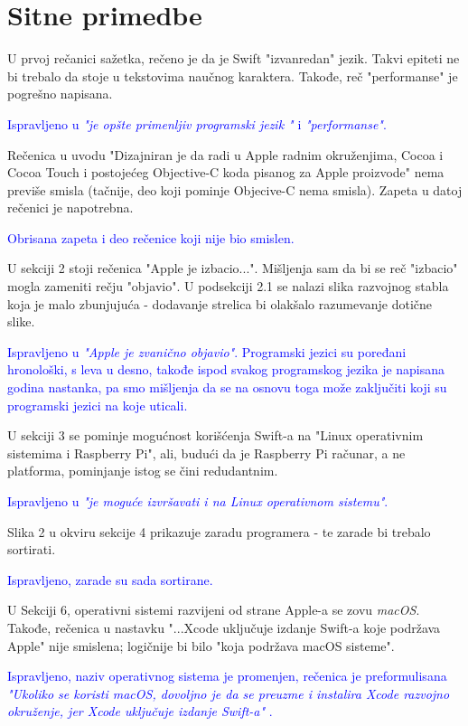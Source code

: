 \documentclass[a4paper]{report}
\newcommand{\odgovor}[1]{\textcolor{blue}{#1}}
\begin{document}
\section{Sitne primedbe}

U prvoj rečanici sažetka, rečeno je da je Swift "izvanredan" jezik. Takvi epiteti ne bi trebalo da stoje u tekstovima naučnog karaktera. Takođe, reč "performanse" je pogrešno napisana.

\odgovor{Ispravljeno u \textit{"je opšte primenljiv programski jezik "} i \textit{"performanse"}.}


Rečenica u uvodu "Dizajniran je da radi u Apple radnim okruženjima, Cocoa i Cocoa Touch i postojećeg Objective-C koda pisanog za Apple proizvode" nema previše smisla (tačnije, deo koji pominje Objecive-C nema smisla). Zapeta u datoj rečenici je napotrebna.

\odgovor{Obrisana zapeta i deo rečenice koji nije bio smislen.}

U sekciji 2 stoji rečenica "Apple je izbacio...". Mišljenja sam da bi se reč "izbacio" mogla zameniti rečju "objavio". U podsekciji 2.1 se nalazi slika razvojnog stabla koja je malo zbunjujuća - dodavanje strelica bi olakšalo razumevanje dotične slike.

\odgovor{Ispravljeno u \textit{"Apple je zvanično objavio"}. Programski jezici su poređani hronološki, s leva u desno, takođe ispod svakog programskog jezika je napisana godina nastanka, pa smo mišljenja da se na osnovu toga može zaključiti koji su programski jezici na koje uticali.}

U sekciji 3 se pominje mogućnost korišćenja Swift-a na "Linux operativnim sistemima i Raspberry Pi", ali, budući da je Raspberry Pi računar, a ne platforma, pominjanje istog se čini redudantnim.

\odgovor{Ispravljeno u \textit{"je moguće izvršavati i na Linux operativnom sistemu"}. }

Slika 2 u okviru sekcije 4 prikazuje zaradu programera - te zarade bi trebalo sortirati.

\odgovor{Ispravljeno, zarade su sada sortirane.}

U Sekciji 6, operativni sistemi razvijeni od strane Apple-a se zovu \textit{macOS}. Takođe, rečenica u nastavku "...Xcode uključuje izdanje Swift-a koje podržava Apple" nije smislena; logičnije bi bilo "koja podržava macOS sisteme".

\odgovor{Ispravljeno, naziv operativnog sistema je promenjen, rečenica je preformulisana \textit{"Ukoliko se koristi macOS, dovoljno je da se preuzme i instalira Xcode razvojno okruženje, jer Xcode uključuje izdanje Swift-a"} .}
\end{document}
